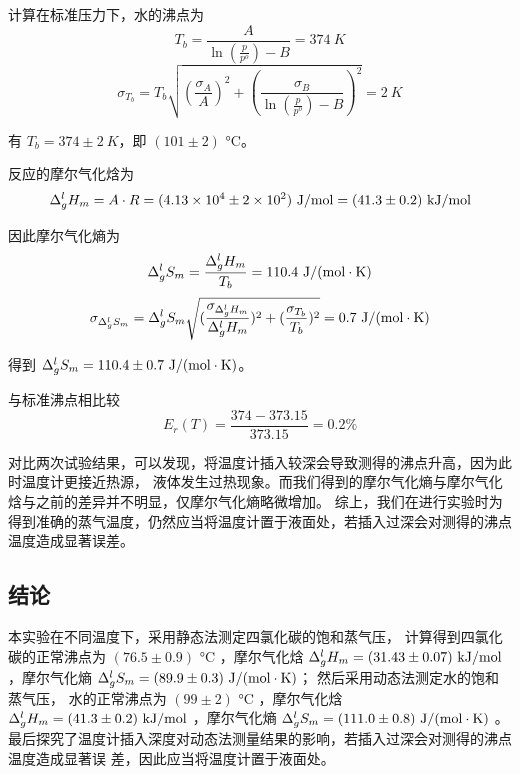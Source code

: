\documentclass[cn,hazy,pku,12pt,normal,math=newtx,cite=super]{elegantnote}
\begin{document}
计算在标准压力下，水的沸点为
$$
T_b = \frac{A}{\ln(\frac{p}{p^o})-B} = 374\ K
$$
$$
\sigma_{T_b} = T_b\sqrt{(\frac{\sigma_A}{A})^2+(\frac{\sigma_B}{\ln(\frac{p}{p^o})-B})^2} = 2\ K
$$

有 $T_b = 374 \pm 2\ K$，即 $(101 \pm 2)$ °C。

反应的摩尔气化焓为
$$
\Delta^l_g H_m = A \cdot R = (4.13 \times 10^4 \pm 2 \times 10^2) \ {\rm J/mol} = (41.3 \pm 0.2) \ {\rm kJ/mol}
$$

因此摩尔气化熵为
$$
\Delta^l_g S_m = \frac{\Delta^l_g H_m}{T_b} = 110.4\ {\rm J/(mol \cdot K)}
$$
$$
\sigma_{\Delta^l_g S_m} = \Delta^l_g S_m\sqrt{(\frac{\sigma_{\Delta^l_g H_m}}{\Delta^l_g H_m})^2+(\frac{\sigma_{T_b}}{T_b})^2} = 0.7\ {\rm J/(mol \cdot K)}
$$

得到 $\Delta^l_g S_m = 110.4 \pm 0.7\ {\rm J/(mol\cdot K)}$。

与标准沸点相比较
$$
E_r(T) = \frac{374 - 373.15}{373.15} = 0.2 \%
$$

对比两次试验结果，可以发现，将温度计插入较深会导致测得的沸点升高，因为此时温度计更接近热源，
液体发生过热现象。而我们得到的摩尔气化熵与摩尔气化焓与之前的差异并不明显，仅摩尔气化熵略微增加。
综上，我们在进行实验时为得到准确的蒸气温度，仍然应当将温度计置于液面处，若插入过深会对测得的沸点温度造成显著误差。

\subsection{结论}

本实验在不同温度下，采用静态法测定四氯化碳的饱和蒸气压，
计算得到四氯化碳的正常沸点为
$(76.5 \pm 0.9)$ °C
，摩尔气化焓 $\Delta^l_g H_m = (31.43 \pm 0.07) \ {\rm kJ/mol}$
，摩尔气化熵 $\Delta^l_g S_m = (89.9 \pm 0.3)\ {\rm J/(mol\cdot K)}$；
然后采用动态法测定水的饱和蒸气压，
水的正常沸点为 $(99 \pm 2)$ °C
，摩尔气化焓 $\Delta^l_g H_m = (41.3 \pm 0.2) \ {\rm kJ/mol}$
，摩尔气化熵 $\Delta^l_g S_m = (111.0 \pm 0.8)\ {\rm J/(mol\cdot K)}$
。最后探究了温度计插入深度对动态法测量结果的影响，若插入过深会对测得的沸点温度造成显著误
差，因此应当将温度计置于液面处。


\nocite{*}

\end{document}
